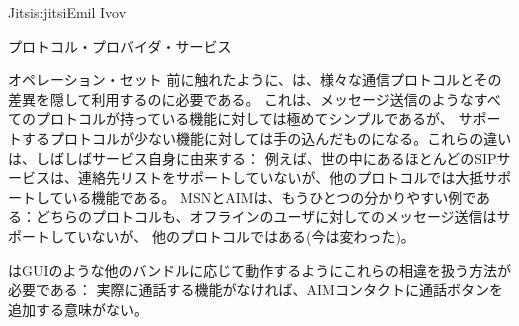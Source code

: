 \begin{aosachapter}{Jitsi}{s:jitsi}{Emil Ivov}
\begin{aosasect1}{プロトコル・プロバイダ・サービス}
\begin{aosasect2}{オペレーション・セット}
前に触れたように、は、様々な通信プロトコルとその差異を隠して利用するのに必要である。
これは、メッセージ送信のようなすべてのプロトコルが持っている機能に対しては極めてシンプルであるが、
サポートするプロトコルが少ない機能に対しては手の込んだものになる。これらの違いは、しばしばサービス自身に由来する：
例えば、世の中にあるほとんどのSIPサービスは、連絡先リストをサポートしていないが、他のプロトコルでは大抵サポートしている機能である。
MSNとAIMは、もうひとつの分かりやすい例である：どちらのプロトコルも、オフラインのユーザに対してのメッセージ送信はサポートしていないが、
他のプロトコルではある(今は変わった)。

はGUIのような他のバンドルに応じて動作するようにこれらの相違を扱う方法が必要である：
実際に通話する機能がなければ、AIMコンタクトに通話ボタンを追加する意味がない。


\end{aosasect2}
\end{aosasect1}
\end{aosachapter}
